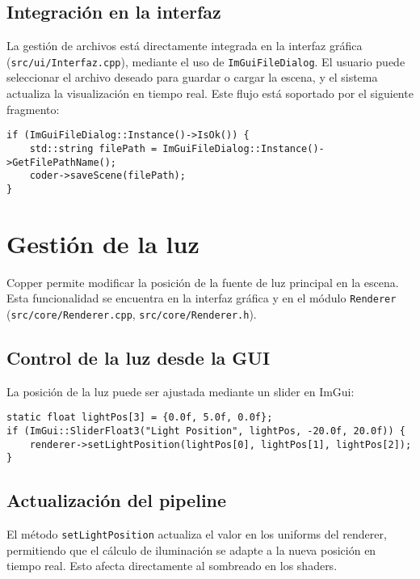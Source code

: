 \subsection{Integración en la interfaz}

La gestión de archivos está directamente integrada en la interfaz gráfica
(\texttt{src/ui/Interfaz.cpp}), mediante el uso de \texttt{ImGuiFileDialog}. El
usuario puede seleccionar el archivo deseado para guardar o cargar la escena, y
el sistema actualiza la visualización en tiempo real. Este flujo está soportado
por el siguiente fragmento:

\begin{verbatim}
if (ImGuiFileDialog::Instance()->IsOk()) {
    std::string filePath = ImGuiFileDialog::Instance()->GetFilePathName();
    coder->saveScene(filePath);
}
\end{verbatim}

\section{Gestión de la luz}

Copper permite modificar la posición de la fuente de luz principal en la
escena. Esta funcionalidad se encuentra en la interfaz gráfica y en el módulo
\texttt{Renderer} (\texttt{src/core/Renderer.cpp},
\texttt{src/core/Renderer.h}).

\subsection{Control de la luz desde la GUI}

La posición de la luz puede ser ajustada mediante un slider en ImGui:

\begin{verbatim}
static float lightPos[3] = {0.0f, 5.0f, 0.0f};
if (ImGui::SliderFloat3("Light Position", lightPos, -20.0f, 20.0f)) {
    renderer->setLightPosition(lightPos[0], lightPos[1], lightPos[2]);
}
\end{verbatim}

\subsection{Actualización del pipeline}

El método \texttt{setLightPosition} actualiza el valor en los uniforms del
renderer, permitiendo que el cálculo de iluminación se adapte a la nueva
posición en tiempo real. Esto afecta directamente al sombreado en los shaders.

